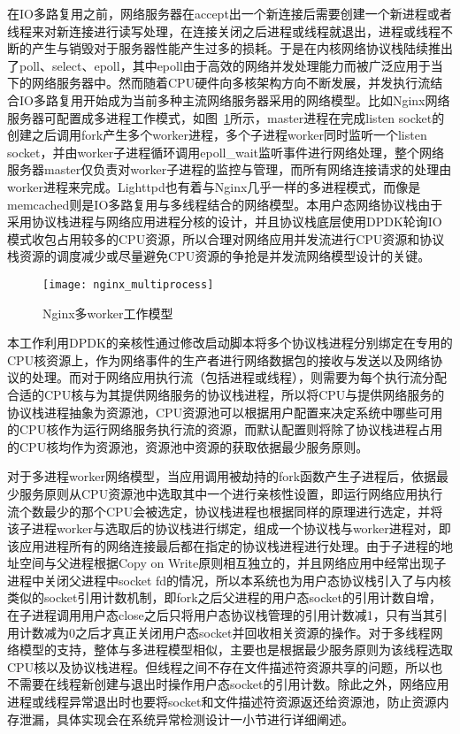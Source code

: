 在IO多路复用之前，网络服务器在accept出一个新连接后需要创建一个新进程或者线程来对新连接进行读写处理，在连接关闭之后进程或线程就退出，进程或线程不断的产生与销毁对于服务器性能产生过多的损耗。于是在内核网络协议栈陆续推出了poll、select、epoll，其中epoll由于高效的网络并发处理能力而被广泛应用于当下的网络服务器中。然而随着CPU硬件向多核架构方向不断发展，并发执行流结合IO多路复用开始成为当前多种主流网络服务器采用的网络模型。比如Nginx网络服务器可配置成多进程工作模式，如图~\ref{fig:nginx_multiprocess}所示，master进程在完成listen socket的创建之后调用fork产生多个worker进程，多个子进程worker同时监听一个listen socket，并由worker子进程循环调用epoll\_wait监听事件进行网络处理，整个网络服务器master仅负责对worker子进程的监控与管理，而所有网络连接请求的处理由worker进程来完成。Lighttpd也有着与Nginx几乎一样的多进程模式，而像是memcached则是IO多路复用与多线程结合的网络模型。本用户态网络协议栈由于采用协议栈进程与网络应用进程分核的设计，并且协议栈底层使用DPDK轮询IO模式收包占用较多的CPU资源，所以合理对网络应用并发流进行CPU资源和协议栈资源的调度减少或尽量避免CPU资源的争抢是并发流网络模型设计的关键。

\vspace{-10pt}
\begin{figure}[H] %
  \centering
  \texttt{[image: nginx\_multiprocess]}
  \caption{Nginx多worker工作模型}
  \label{fig:nginx_multiprocess}
\end{figure}
\vspace{-10pt}

本工作利用DPDK的亲核性通过修改启动脚本将多个协议栈进程分别绑定在专用的CPU核资源上，作为网络事件的生产者进行网络数据包的接收与发送以及网络协议的处理。而对于网络应用执行流（包括进程或线程），则需要为每个执行流分配合适的CPU核与为其提供网络服务的协议栈进程，所以将CPU与提供网络服务的协议栈进程抽象为资源池，CPU资源池可以根据用户配置来决定系统中哪些可用的CPU核作为运行网络服务执行流的资源，而默认配置则将除了协议栈进程占用的CPU核均作为资源池，资源池中资源的获取依据最少服务原则。

对于多进程worker网络模型，当应用调用被劫持的fork函数产生子进程后，依据最少服务原则从CPU资源池中选取其中一个进行亲核性设置，即运行网络应用执行流个数最少的那个CPU会被选定，协议栈进程也根据同样的原理进行选定，并将该子进程worker与选取后的协议栈进行绑定，组成一个协议栈与worker进程对，即该应用进程所有的网络连接最后都在指定的协议栈进程进行处理。由于子进程的地址空间与父进程根据Copy on Write原则相互独立的，并且网络应用中经常出现子进程中关闭父进程中socket fd的情况，所以本系统也为用户态协议栈引入了与内核类似的socket引用计数机制，即fork之后父进程的用户态socket的引用计数自增，在子进程调用用户态close之后只将用户态协议栈管理的引用计数减1，只有当其引用计数减为0之后才真正关闭用户态socket并回收相关资源的操作。对于多线程网络模型的支持，整体与多进程模型相似，主要也是根据最少服务原则为该线程选取CPU核以及协议栈进程。但线程之间不存在文件描述符资源共享的问题，所以也不需要在线程新创建与退出时操作用户态socket的引用计数。除此之外，网络应用进程或线程异常退出时也要将socket和文件描述符资源返还给资源池，防止资源内存泄漏，具体实现会在系统异常检测设计一小节进行详细阐述。


